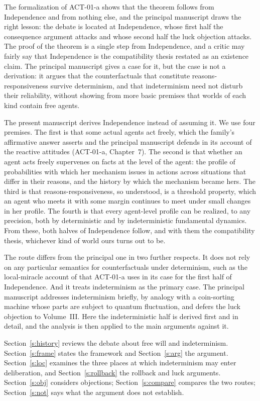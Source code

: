 \documentclass{situationist-preprint}
\begin{document}
The formalization of ACT-01-a shows that the theorem follows from Independence and from nothing else, and the principal manuscript draws the right lesson: the debate is located at Independence, whose first half the consequence argument attacks and whose second half the luck objection attacks. The proof of the theorem is a single step from Independence, and a critic may fairly say that Independence is the compatibility thesis restated as an existence claim. The principal manuscript gives a case for it, but the case is not a derivation: it argues that the counterfactuals that constitute reasons-responsiveness survive determinism, and that indeterminism need not disturb their reliability, without showing from more basic premises that worlds of each kind contain free agents.

The present manuscript derives Independence instead of assuming it. We use four premises. The first is that some actual agents act freely, which the family's affirmative answer asserts and the principal manuscript defends in its account of the reactive attitudes (ACT-01-a, Chapter~7). The second is that whether an agent acts freely supervenes on facts at the level of the agent: the profile of probabilities with which her mechanism issues in actions across situations that differ in their reasons, and the history by which the mechanism became hers. The third is that reasons-responsiveness, so understood, is a threshold property, which an agent who meets it with some margin continues to meet under small changes in her profile. The fourth is that every agent-level profile can be realized, to any precision, both by deterministic and by indeterministic fundamental dynamics. From these, both halves of Independence follow, and with them the compatibility thesis, whichever kind of world ours turns out to be.

The route differs from the principal one in two further respects. It does not rely on any particular semantics for counterfactuals under determinism, such as the local-miracle account of \citet{Lewis1981} that ACT-01-a uses in its case for the first half of Independence. And it treats indeterminism as the primary case. The principal manuscript addresses indeterminism briefly, by analogy with a coin-sorting machine whose parts are subject to quantum fluctuation, and defers the luck objection to Volume~III. Here the indeterministic half is derived first and in detail, and the analysis is then applied to the main arguments against it.

Section~\ref{s:history} reviews the debate about free will and indeterminism. Section~\ref{s:frame} states the framework and Section~\ref{s:arg} the argument. Section~\ref{s:loc} examines the three places at which indeterminism may enter deliberation, and Section~\ref{s:rollback} the rollback and luck arguments. Section~\ref{s:obj} considers objections; Section~\ref{s:compare} compares the two routes; Section~\ref{s:not} says what the argument does not establish.
\end{document}
